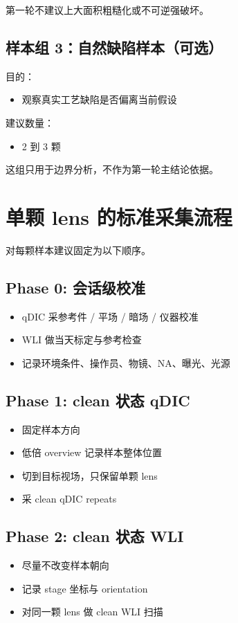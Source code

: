 \documentclass[UTF8,a4paper,11pt]{ctexart}
\begin{document}
第一轮不建议上大面积粗糙化或不可逆强破坏。

\subsection{样本组 3：自然缺陷样本（可选）}

目的：
\begin{itemize}
  \item 观察真实工艺缺陷是否偏离当前假设
\end{itemize}

建议数量：
\begin{itemize}
  \item 2 到 3 颗
\end{itemize}

这组只用于边界分析，不作为第一轮主结论依据。

\section{单颗 lens 的标准采集流程}

对每颗样本建议固定为以下顺序。

\subsection{Phase 0: 会话级校准}
\begin{itemize}
  \item qDIC 采参考件 / 平场 / 暗场 / 仪器校准
  \item WLI 做当天标定与参考检查
  \item 记录环境条件、操作员、物镜、NA、曝光、光源
\end{itemize}

\subsection{Phase 1: clean 状态 qDIC}
\begin{itemize}
  \item 固定样本方向
  \item 低倍 overview 记录样本整体位置
  \item 切到目标视场，只保留单颗 lens
  \item 采 clean qDIC repeats
\end{itemize}

\subsection{Phase 2: clean 状态 WLI}
\begin{itemize}
  \item 尽量不改变样本朝向
  \item 记录 stage 坐标与 orientation
  \item 对同一颗 lens 做 clean WLI 扫描
\end{itemize}
\end{document}
